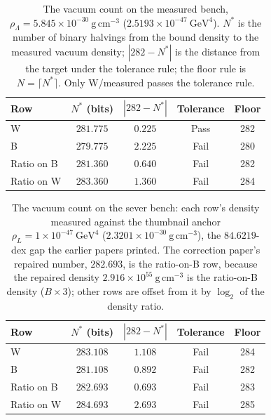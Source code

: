 \documentclass[11pt]{article}
\begin{document}
\begin{table}[h]
\centering
\caption{The vacuum count on the measured bench,
$\rho_\Lambda = 5.845\times10^{-30}\ \mathrm{g\,cm^{-3}}$
($2.5193\times10^{-47}\ \mathrm{GeV}^4$). $N^*$ is the number of binary
halvings from the bound density to the measured vacuum density;
$|282-N^*|$ is the distance from the target under the tolerance rule;
the floor rule is $N = \lceil N^*\rceil$. Only W/measured passes the
tolerance rule.}\label{tab:count-meas}
\begin{tabular}{lcccc}
\toprule
Row & $N^*$ (bits) & $|282-N^*|$ & Tolerance & Floor \\
\midrule
W & $281.775$ & $0.225$ & Pass & 282 \\
B & $279.775$ & $2.225$ & Fail & 280 \\
Ratio on B & $281.360$ & $0.640$ & Fail & 282 \\
Ratio on W & $283.360$ & $1.360$ & Fail & 284 \\
\bottomrule
\end{tabular}
\end{table}

\begin{table}[h]
\centering
\caption{The vacuum count on the sever bench: each row's density
measured against the thumbnail anchor $\rho_L = 1\times10^{-47}\
\mathrm{GeV}^4$ ($2.3201\times10^{-30}\ \mathrm{g\,cm^{-3}}$), the
$84.6219$-dex gap the earlier papers printed. The correction paper's
repaired number, $282.693$, is the ratio-on-B row, because the repaired
density $2.916\times10^{55}\ \mathrm{g\,cm^{-3}}$ is the ratio-on-B
density ($B \times 3$); other rows are offset from it by $\log_2$ of the
density ratio.}\label{tab:count-sever}
\begin{tabular}{lcccc}
\toprule
Row & $N^*$ (bits) & $|282-N^*|$ & Tolerance & Floor \\
\midrule
W & $283.108$ & $1.108$ & Fail & 284 \\
B & $281.108$ & $0.892$ & Fail & 282 \\
Ratio on B & $282.693$ & $0.693$ & Fail & 283 \\
Ratio on W & $284.693$ & $2.693$ & Fail & 285 \\
\bottomrule
\end{tabular}
\end{table}
\end{document}
